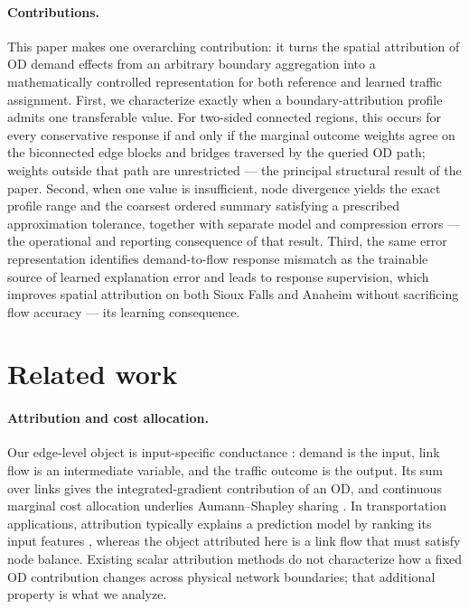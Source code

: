 \documentclass[a4paper,fleqn]{cas-sc}
\begin{document}
\paragraph{Contributions.}
This paper makes one overarching contribution: it turns the spatial
attribution of OD demand effects from an arbitrary boundary aggregation
into a mathematically controlled representation for both reference and
learned traffic assignment. First, we characterize exactly when a
boundary-attribution profile admits one transferable value. For
two-sided connected regions, this occurs for every conservative
response if and only if the marginal outcome weights agree on the
biconnected edge blocks and bridges traversed by the queried OD path;
weights outside that path are unrestricted --- the principal structural
result of the paper. Second, when one value is insufficient, node
divergence yields the exact profile range and the coarsest ordered
summary satisfying a prescribed approximation tolerance, together with
separate model and compression errors --- the operational and
reporting consequence of that result. Third, the same error
representation identifies demand-to-flow response mismatch as the
trainable source of learned explanation error and leads to response
supervision, which improves spatial attribution on both Sioux Falls and
Anaheim without sacrificing flow accuracy --- its learning consequence.

\section{Related work}\label{sec:related}
\paragraph{Attribution and cost allocation.}
Our edge-level object is input-specific conductance
\citep{dhamdhere2019important,lundstrom2022rigorous}: demand is the input,
link flow is an intermediate variable, and the traffic outcome is the output.
Its sum over links gives the integrated-gradient contribution of an OD, and
continuous marginal cost allocation underlies Aumann--Shapley sharing
\citep{aumann1974values,billera1978internal}. In transportation
applications, attribution typically explains a prediction model by ranking
its input features \citep{sariyer2024leveraging,guo2024towards}, whereas
the object attributed here is a link flow that must satisfy node balance.
Existing scalar attribution methods do not characterize how a fixed OD
contribution changes across physical network boundaries; that additional
property is what we analyze.
\end{document}
